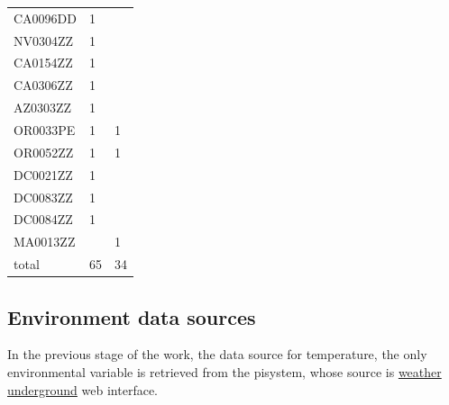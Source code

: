 \documentclass[12pt]{article}
\begin{document}
\begin{longtable}{lll}
CA0096DD         & 1             &          \\
NV0304ZZ         & 1             &          \\
CA0154ZZ         & 1             &          \\
CA0306ZZ         & 1             &          \\
AZ0303ZZ         & 1             &          \\
OR0033PE         & 1             & 1        \\
OR0052ZZ         & 1             & 1        \\
DC0021ZZ         & 1             &          \\
DC0083ZZ         & 1             &          \\
DC0084ZZ         & 1             &          \\
MA0013ZZ         &               & 1        \\
\hline
total            & 65            & 34       \\
\hline
\end{longtable}
\FloatBarrier
\subsection{Environment data sources}
In the previous stage of the work, the data source for temperature,
the only environmental variable is retrieved from the pisystem, whose
source is \href{https://www.wunderground.com/}{weather
  underground} web interface. 
\end{document}
